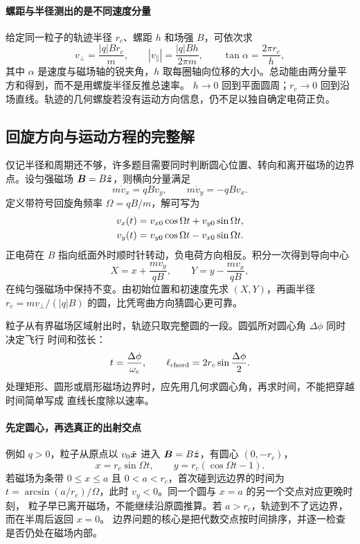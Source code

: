 {\particleTracksContext


\paragraph{螺距与半径测出的是不同速度分量}
给定同一粒子的轨迹半径 $r_c$、螺距 $h$ 和场强 $B$，可依次求
\[
 v_\perp=\frac{|q|Br_c}{m},\qquad
 |v_\parallel|=\frac{|q|Bh}{2\pi m},\qquad
 \tan\alpha=\frac{2\pi r_c}{h},
\]
其中 $\alpha$ 是速度与磁场轴的锐夹角，$h$ 取每圈轴向位移的大小。总动能由两分量平方和得到，而不是用螺旋半径反推总速率。
$h\to0$ 回到平面圆周；$r_c\to0$ 回到沿场直线。轨迹的几何螺旋若没有运动方向信息，仍不足以独自确定电荷正负。


\subsection{回旋方向与运动方程的完整解}


仅记半径和周期还不够，许多题目需要同时判断圆心位置、转向和离开磁场的边界点。设匀强磁场
$\bm{B}=B\hat{\bm{z}}$，则横向分量满足
\begin{equation}
 m\dot v_x=qBv_y,
 \qquad
 m\dot v_y=-qBv_x.
\end{equation}
定义带符号回旋角频率 $\Omega=qB/m$，解可写为
\begin{align}
 v_x(t)&=v_{x0}\cos\Omega t+v_{y0}\sin\Omega t,\notag\\
 v_y(t)&=v_{y0}\cos\Omega t-v_{x0}\sin\Omega t.
\end{align}
正电荷在 $B$ 指向纸面外时顺时针转动，负电荷方向相反。积分一次得到导向中心
\begin{equation}
 X=x+\frac{mv_y}{qB},
 \qquad
 Y=y-\frac{mv_x}{qB},
\end{equation}
在纯匀强磁场中保持不变。由初始位置和初速度先求 $(X,Y)$，再画半径
$r_c=mv_\perp/(|q|B)$ 的圆，比凭弯曲方向猜圆心更可靠。

粒子从有界磁场区域射出时，轨迹只取完整圆的一段。圆弧所对圆心角 $\Delta\phi$ 同时决定飞行
时间和弦长：
\begin{equation}
 t=\frac{\Delta\phi}{\omega_c},
 \qquad
 \ell_{\rm chord}=2r_c\sin\frac{\Delta\phi}{2}.
\end{equation}
处理矩形、圆形或扇形磁场边界时，应先用几何求圆心角，再求时间，不能把穿越时间简单写成
直线长度除以速率。



\paragraph{先定圆心，再选真正的出射交点}
例如 $q>0$，粒子从原点以 $v_0\hat{\bm{x}}$ 进入 $\bm{B}=B\hat{\bm{z}}$，有圆心 $(0,-r_c)$，
\[
 x=r_c\sin\Omega t,\qquad y=r_c(\cos\Omega t-1).
\]
若磁场为条带 $0\le x\le a$ 且 $0<a<r_c$，首次碰到远边界的时间为
$t=\arcsin(a/r_c)/\Omega$，此时 $v_y<0$。同一个圆与 $x=a$ 的另一个交点对应更晚时刻，
粒子早已离开磁场，不能继续沿原圆推算。若 $a>r_c$，轨迹到不了远边界，而在半周后返回 $x=0$。
边界问题的核心是把代数交点按时间排序，并逐一检查是否仍处在磁场内部。


}
